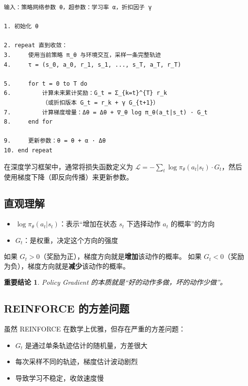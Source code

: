 \documentclass[12pt,a4paper]{article}
\theoremstyle{noteplain}
\newtheorem{important}{重要结论}[section]
\theoremstyle{noteexercise}
\begin{document}
\begin{darkbox}
\begin{verbatim}
输入：策略网络参数 θ，超参数：学习率 α，折扣因子 γ

1. 初始化 θ

2. repeat 直到收敛：
3.     使用当前策略 π_θ 与环境交互，采样一条完整轨迹
4.     τ = (s_0, a_0, r_1, s_1, ..., s_T, a_T, r_T)

5.     for t = 0 to T do
6.         计算未来累计奖励：G_t = Σ_{k=t}^{T} r_k
           （或折扣版本 G_t = r_k + γ G_{t+1}）
7.         计算梯度增量：Δθ = Δθ + ∇_θ log π_θ(a_t|s_t) · G_t
8.     end for

9.     更新参数：θ = θ + α · Δθ
10. end repeat
\end{verbatim}
\end{darkbox}

在深度学习框架中，通常将损失函数定义为 $\mathcal{L} = -\sum_t \log \pi_\theta(a_t|s_t) \cdot G_t$，然后使用梯度下降（即反向传播）来更新参数。

\subsection{直观理解}\label{ssec:reinforce-intuition}

\begin{itemize}
  \setlength{\itemsep}{0.4em}
  \item $\log \pi_\theta(a_t|s_t)$：表示``增加在状态 $s_t$ 下选择动作 $a_t$ 的概率''的方向
  \item $G_t$：是权重，决定这个方向的强度
\end{itemize}

如果 $G_t > 0$（奖励为正），梯度方向就是\textbf{增加}该动作的概率。
如果 $G_t < 0$（奖励为负），梯度方向就是\textbf{减少}该动作的概率。

\begin{important}
  Policy Gradient 的本质就是``好的动作多做，坏的动作少做''。
\end{important}

\subsection{REINFORCE 的方差问题}\label{ssec:reinforce-variance}

虽然 REINFORCE 在数学上优雅，但存在严重的方差问题：
\begin{itemize}
  \setlength{\itemsep}{0.2em}
  \item $G_t$ 是通过单条轨迹估计的随机量，方差很大
  \item 每次采样不同的轨迹，梯度估计波动剧烈
  \item 导致学习不稳定，收敛速度慢
\end{itemize}
\end{document}

